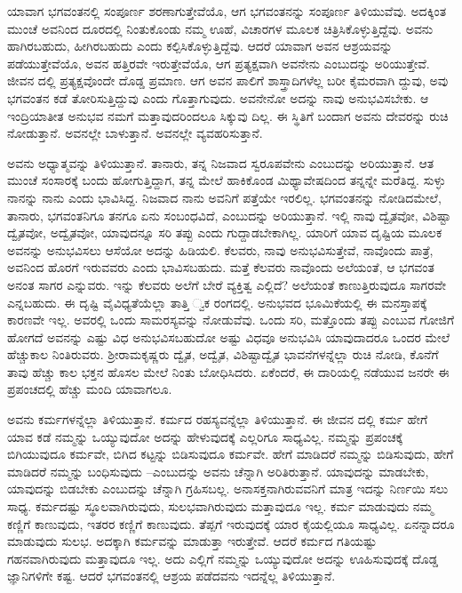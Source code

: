 ಯಾವಾಗ ಭಗವಂತನಲ್ಲಿ ಸಂಪೂರ್ಣ ಶರಣಾಗುತ್ತೇವೆಯೊ, ಆಗ ಭಗವಂತನನ್ನು ಸಂಪೂರ್ಣ ತಿಳಿಯುವೆವು. ಅದಕ್ಕಿಂತ ಮುಂಚೆ ಅವನಿಂದ ದೂರದಲ್ಲಿ ನಿಂತುಕೊಂಡು ನಮ್ಮ ಊಹೆ, ವಿಚಾರಗಳ ಮೂಲಕ ಚಿತ್ರಿಸಿಕೊಳ್ಳುತ್ತಿದ್ದೆವು. ಅವನು ಹಾಗಿರಬಹುದು, ಹೀಗಿರಬಹುದು ಎಂದು ಕಲ್ಪಿಸಿಕೊಳ್ಳುತ್ತಿದ್ದೆವು. ಆದರೆ ಯಾವಾಗ ಅವನ ಆಶ್ರಯವನ್ನು ಪಡೆಯುತ್ತೇವೆಯೊ, ಅವನ ಹತ್ತಿರವೇ ಇರುತ್ತೇವೆಯೊ, ಆಗ ಪ್ರತ್ಯಕ್ಷವಾಗಿ ಅವನೇನು ಎಂಬುದನ್ನು ಅರಿಯುತ್ತೇವೆ. ಜೀವನ ದಲ್ಲಿ ಪ್ರತ್ಯಕ್ಷವೊಂದೇ ದೊಡ್ಡ ಪ್ರಮಾಣ. ಆಗ ಅವನ ಪಾಲಿಗೆ ಶಾಸ್ತ್ರಾದಿಗಳೆಲ್ಲ ಬರೀ ಕೈಮರವಾಗಿ ದ್ದುವು, ಅವು ಭಗವಂತನ ಕಡೆ ತೋರಿಸುತ್ತಿದ್ದುವು ಎಂದು ಗೊತ್ತಾಗುವುದು. ಅವನೇನೋ ಅದನ್ನು ನಾವು ಅನುಭವಿಸಬೇಕು. ಆ ಇಂದ್ರಿಯಾತೀತ ಅನುಭವ ನಮಗೆ ಮತ್ತಾವುದರಿಂದಲೂ ಸಿಕ್ಕುವು ದಿಲ್ಲ. ಈ ಸ್ಥಿತಿಗೆ ಬಂದಾಗ ಅವನು ದೇವರನ್ನು ರುಚಿ ನೋಡುತ್ತಾನೆ. ಅವನಲ್ಲೇ ಬಾಳುತ್ತಾನೆ. ಅವನಲ್ಲೇ ವ್ಯವಹರಿಸುತ್ತಾನೆ.

ಅವನು ಅಧ್ಯಾತ್ಮವನ್ನು ತಿಳಿಯುತ್ತಾನೆ. ತಾನಾರು, ತನ್ನ ನಿಜವಾದ ಸ್ವರೂಪವೇನು ಎಂಬುದನ್ನು ಅರಿಯುತ್ತಾನೆ. ಆತ ಮುಂಚೆ ಸಂಸಾರಕ್ಕೆ ಬಂದು ಹೋಗುತ್ತಿದ್ದಾಗ, ತನ್ನ ಮೇಲೆ ಹಾಕಿಕೊಂಡ ಮಿಥ್ಯಾವೇಷದಿಂದ ತನ್ನನ್ನೇ ಮರೆತಿದ್ದ. ಸುಳ್ಳು ನಾನನ್ನು ನಾನು ಎಂದು ಭಾವಿಸಿದ್ದ. ನಿಜವಾದ ನಾನು ಅವನಿಗೆ ಪತ್ತೆಯೇ ಇರಲಿಲ್ಲ. ಭಗವಂತನನ್ನು ನೋಡಿದಮೇಲೆ, ತಾನಾರು, ಭಗವಂತನಿಗೂ ತನಗೂ ಏನು ಸಂಬಂಧವಿದೆ, ಎಂಬುದನ್ನು ಅರಿಯುತ್ತಾನೆ. ಇಲ್ಲಿ ನಾವು ದ್ವೈತವೋ, ವಿಶಿಷ್ಟಾ ದ್ವೈತವೋ, ಅದ್ವೈತವೋ, ಯಾವುದನ್ನೂ ಸರಿ ತಪ್ಪು ಎಂದು ಗುದ್ದಾಡಬೇಕಾಗಿಲ್ಲ. ಯಾರಿಗೆ ಯಾವ ದೃಷ್ಟಿಯ ಮೂಲಕ ಅವನನ್ನು ಅನುಭವಿಸಲು ಆಸೆಯೋ ಅದನ್ನು ಹಿಡಿಯಲಿ. ಕೆಲವರು, ನಾವು ಅನುಭವಿಸುತ್ತೇವೆ, ನಾವೊಂದು ಪಾತ್ರೆ, ಅವನಿಂದ ಹೊರಗೆ ಇರುವವರು ಎಂದು ಭಾವಿಸಬಹುದು. ಮತ್ತೆ ಕೆಲವರು ನಾವೊಂದು ಅಲೆಯಂತೆ, ಆ ಭಗವಂತ ಅನಂತ ಸಾಗರ ಎನ್ನುವರು. ಇನ್ನು ಕೆಲವರು ಅಲೆಗೆ ಬೇರೆ ವ್ಯಕ್ತಿತ್ವ ಎಲ್ಲಿದೆ? ಅಲೆಯಂತೆ ಕಾಣುತ್ತಿರುವುದೂ ಸಾಗರವೇ ಎನ್ನಬಹುದು. ಈ ದೃಷ್ಟಿ ವೈವಿಧ್ಯತೆಯೆಲ್ಲಾ ತಾತ್ತಿ ್ವಕ ರಂಗದಲ್ಲಿ. ಅನುಭವದ ಭೂಮಿಕೆಯಲ್ಲಿ ಈ ಮನಸ್ತಾಪಕ್ಕೆ ಕಾರಣವೇ ಇಲ್ಲ. ಅವರಲ್ಲಿ ಒಂದು ಸಾಮರಸ್ಯವನ್ನು ನೋಡುವೆವು. ಒಂದು ಸರಿ, ಮತ್ತೊಂದು ತಪ್ಪು ಎಂಬುವ ಗೋಜಿಗೆ ಹೋಗದೆ ಅವನನ್ನು ಎಷ್ಟು ವಿಧ ಅನುಭವಿಸಬಹುದೋ ಅಷ್ಟು ವಿಧವೂ ಅನುಭವಿಸಿ ಯಾವುದಾದರೂ ಒಂದರ ಮೇಲೆ ಹೆಚ್ಚುಕಾಲ ನಿಂತಿರುವರು. ಶ್ರೀರಾಮಕೃಷ್ಣರು ದ್ವೈತ, ಅದ್ವೈತ, ವಿಶಿಷ್ಟಾದ್ವೈತ ಭಾವನೆಗಳನ್ನೆಲ್ಲಾ ರುಚಿ ನೋಡಿ, ಕೊನೆಗೆ ತಾವು ಹೆಚ್ಚು ಕಾಲ ಭಕ್ತನ ಹೊಸಲ ಮೇಲೆ ನಿಂತು ಬೋಧಿಸಿದರು. ಏಕೆಂದರೆ, ಈ ದಾರಿಯಲ್ಲಿ ನಡೆಯುವ ಜನರೇ ಈ ಪ್ರಪಂಚದಲ್ಲಿ ಹೆಚ್ಚು ಮಂದಿ ಯಾವಾಗಲೂ.

ಅವನು ಕರ್ಮಗಳನ್ನೆಲ್ಲಾ ತಿಳಿಯುತ್ತಾನೆ. ಕರ್ಮದ ರಹಸ್ಯವನ್ನೆಲ್ಲಾ ತಿಳಿಯುತ್ತಾನೆ. ಈ ಜೀವನ ದಲ್ಲಿ ಕರ್ಮ ಹೇಗೆ ಯಾವ ಕಡೆ ನಮ್ಮನ್ನು ಒಯ್ಯುವುದೋ ಅದನ್ನು ಹೇಳುವುದಕ್ಕೆ ಎಲ್ಲರಿಗೂ ಸಾಧ್ಯವಿಲ್ಲ. ನಮ್ಮನ್ನು ಪ್ರಪಂಚಕ್ಕೆ ಬಿಗಿಯುವುದೂ ಕರ್ಮವೇ, ಬಿಗಿದ ಕಟ್ಟನ್ನು ಬಿಡಿಸುವುದೂ ಕರ್ಮವೇ. ಹೇಗೆ ಮಾಡಿದರೆ ನಮ್ಮನ್ನು ಬಿಡಿಸುವುದು, ಹೇಗೆ ಮಾಡಿದರೆ ನಮ್ಮನ್ನು ಬಂಧಿಸುವುದು –ಎಂಬುದನ್ನು ಅವನು ಚೆನ್ನಾಗಿ ಅರಿತಿರುತ್ತಾನೆ. ಯಾವುದನ್ನು ಮಾಡಬೇಕು, ಯಾವುದನ್ನು ಬಿಡಬೇಕು ಎಂಬುದನ್ನು ಚೆನ್ನಾಗಿ ಗ್ರಹಿಸಬಲ್ಲ. ಅನಾಸಕ್ತನಾಗಿರುವವನಿಗೆ ಮಾತ್ರ ಇದನ್ನು ನಿರ್ಣಯಿ ಸಲು ಸಾಧ್ಯ. ಕರ್ಮದಷ್ಟು ಸ್ಥೂಲವಾಗಿರುವುದು, ಸುಲಭವಾಗಿರುವುದು ಮತ್ತಾವುದೂ ಇಲ್ಲ. ಕರ್ಮ ಮಾಡುವುದು ನಮ್ಮ ಕಣ್ಣಿಗೆ ಕಾಣುವುದು, ಇತರರ ಕಣ್ಣಿಗೆ ಕಾಣುವುದು. ತೆಪ್ಪಗೆ ಇರುವುದಕ್ಕೆ ಯಾರ ಕೈಯಲ್ಲಿಯೂ ಸಾಧ್ಯವಿಲ್ಲ. ಏನನ್ನಾದರೂ ಮಾಡುವುದು ಸುಲಭ. ಅದಕ್ಕಾಗಿ ಕರ್ಮವನ್ನು ಮಾಡುತ್ತಾ ಇರುತ್ತೇವೆ. ಆದರೆ ಕರ್ಮದ ಗತಿಯಷ್ಟು ಗಹನವಾಗಿರುವುದು ಮತ್ತಾವುದೂ ಇಲ್ಲ. ಅದು ಎಲ್ಲಿಗೆ ನಮ್ಮನ್ನು ಒಯ್ಯುವುದೋ ಅದನ್ನು ಊಹಿಸುವುದಕ್ಕೆ ದೊಡ್ಡ ಜ್ಞಾನಿಗಳಿಗೇ ಕಷ್ಟ. ಆದರೆ ಭಗವಂತನಲ್ಲಿ ಆಶ್ರಯ ಪಡೆದವನು ಇದನ್ನೆಲ್ಲ ತಿಳಿಯುತ್ತಾನೆ.

